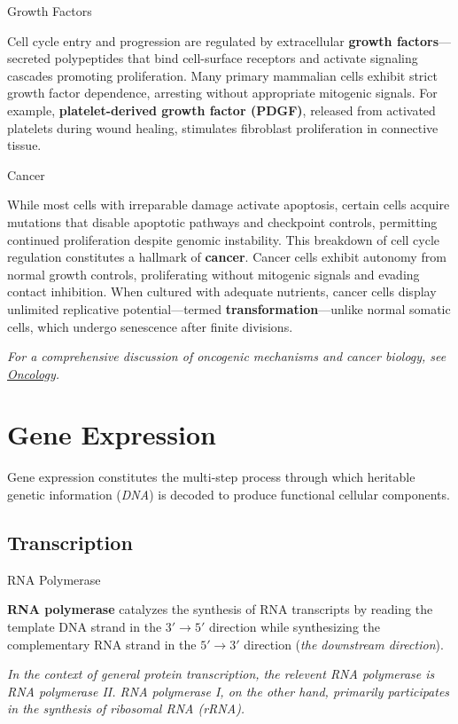 \documentclass[10pt]{article}
\begin{document}
    \begin{core}{Growth Factors}

      Cell cycle entry and progression are regulated by extracellular \textbf{growth factors}---secreted polypeptides that bind cell-surface receptors and activate signaling cascades promoting proliferation. Many primary mammalian cells exhibit strict growth factor dependence, arresting without appropriate mitogenic signals. For example, \textbf{platelet-derived growth factor (PDGF)}, released from activated platelets during wound healing, stimulates fibroblast proliferation in connective tissue.

    \end{core}
    
    \begin{core}{Cancer}

      While most cells with irreparable damage activate apoptosis, certain cells acquire mutations that disable apoptotic pathways and checkpoint controls, permitting continued proliferation despite genomic instability. This breakdown of cell cycle regulation constitutes a hallmark of \textbf{cancer}. Cancer cells exhibit autonomy from normal growth controls, proliferating without mitogenic signals and evading contact inhibition. When cultured with adequate nutrients, cancer cells display unlimited replicative potential---termed \textbf{transformation}---unlike normal somatic cells, which undergo senescence after finite divisions.

      \textit{For a comprehensive discussion of oncogenic mechanisms and cancer biology, see \href{../oncology/oncology.pdf}{Oncology}.}

    \end{core}
 
\section{Gene Expression}
  \label{sec:gene_expression}

  Gene expression constitutes the multi-step process through which heritable genetic information (\textit{DNA}) is decoded to produce functional cellular components.

  \subsection{Transcription}

    \begin{core}{RNA Polymerase}
 
      \textbf{RNA polymerase} catalyzes the synthesis of RNA transcripts by reading the template DNA strand in the $3' \to 5'$ direction while synthesizing the complementary RNA strand in the $5' \to 3'$ direction (\textit{the downstream direction}).

      \textit{In the context of general protein transcription, the relevent RNA polymerase is RNA polymerase II. RNA polymerase I, on the other hand, primarily participates in the synthesis of ribosomal RNA (rRNA).}

    \end{core}
\end{document}
